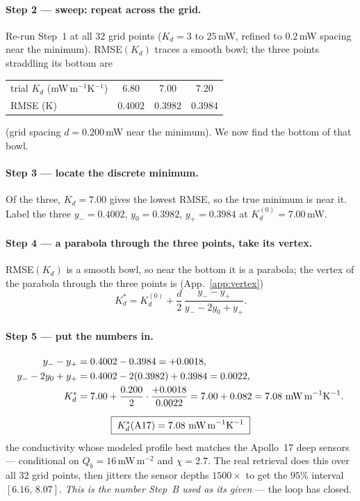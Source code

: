 \documentclass[11pt]{report}
\begin{document}
\paragraph{Step 2 --- sweep: repeat across the grid.}
Re-run Step~1 at all $32$ grid points ($K_d=3$ to $25$\,mW, refined to $0.2$\,mW spacing
near the minimum). RMSE$(K_d)$ traces a smooth
bowl; the three points straddling its bottom are
\begin{center}\small
\begin{tabular}{@{}lccc@{}}
\toprule
trial $K_d$ (mW\,m$^{-1}$K$^{-1}$) & $6.80$ & $\mathbf{7.00}$ & $7.20$ \\
RMSE (K) & $0.4002$ & $\mathbf{0.3982}$ & $0.3984$ \\
\bottomrule
\end{tabular}
\end{center}
(grid spacing $d=0.200$\,mW near the minimum). We now find the bottom of that bowl.

\paragraph{Step 3 --- locate the discrete minimum.} Of the three, $K_d=7.00$ gives the
lowest RMSE, so the true minimum is near it. Label the three
$y_-=0.4002$, $y_0=0.3982$, $y_+=0.3984$ at $K_d^{(0)}=7.00$\,mW.

\paragraph{Step 4 --- a parabola through the three points, take its vertex.} RMSE$(K_d)$
is a smooth bowl, so near the bottom it is a parabola; the vertex of the parabola through
the three points is (App.~\ref{app:vertex})
\[
K_d^{*}=K_d^{(0)}+\frac{d}{2}\,\frac{y_--y_+}{y_--2y_0+y_+}.
\]

\paragraph{Step 5 --- put the numbers in.}
\begin{align*}
y_--y_+&=0.4002-0.3984=+0.0018,\\
y_--2y_0+y_+&=0.4002-2(0.3982)+0.3984=0.0022,\\
K_d^{*}&=7.00+\frac{0.200}{2}\cdot\frac{+0.0018}{0.0022}
        =7.00+0.082=7.08\ \text{mW\,m}^{-1}\text{K}^{-1}.
\end{align*}

\begin{keypt}[title={Answer}]
\[
\boxed{\;K_d^{*}(\mathrm{A17})=7.08\ \text{mW\,m}^{-1}\text{K}^{-1}\;}
\]
the conductivity whose modeled profile best matches the Apollo~17 deep sensors ---
conditional on $Q_b=16$\,mW\,m$^{-2}$ and $\chi=2.7$. The real retrieval does this over
all $32$ grid points, then jitters the sensor depths $1500\times$ to get the $95\%$
interval $[6.16,\,8.07]$. \emph{This is the number Step~B used as its given} ---
the loop has closed.
\end{keypt}
\end{document}
